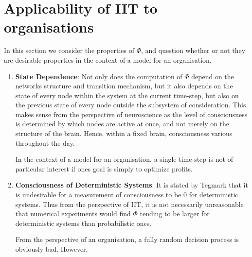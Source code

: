 \section{Applicability of IIT to organisations}
In this section we consider the properties of $\Phi$, and question whether or not they are desirable properties in the context of a model for an organisation.

\begin{enumerate}
	\item \textbf{State Dependence}: Not only does the computation of $\Phi$ depend on the networks structure and transition mechanism, but it also depends on the state of every node within the system at the current time-step, but also on the previous state of every node outside the subsystem of consideration. This makes sense from the perspective of neuroscience as the level of consciousness is determined by which nodes are active at once, and not merely on the structure of the brain. Hence, within a fixed brain, consciousness various throughout the day. 
	
	In the context of a model for an organisation, a single time-step is not of particular interest if ones goal is simply to optimize profits. 
	
	
	\item \textbf{Consciousness of Deterministic Systems}: It is stated by Tegmark \cite{tegmark2016improved} that it is undesirable for a measurement of consciousness to be 0 for deterministic systems. Thus from the perspective of IIT, it is not necessarily unreasonable that numerical experiments would find $\Phi$ tending to be larger for deterministic systems than probabilistic ones.
	
	From the perspective of an organisation, a fully random decision process is obviously bad. However, 
\end{enumerate}